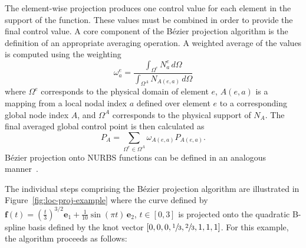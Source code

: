 \documentclass{article}
\renewcommand{\vec}[1]{\boldsymbol{\mathbf{#1}}}
\newcommand{\Bezier}{{B\'{e}zier} }
\begin{document}
The element-wise projection produces one control value for each element in the support of the function.  These values must be combined in order to provide the final control value.  A core component of the B\'ezier projection algorithm is the definition of an appropriate averaging operation.  A weighted average of the values is computed using the weighting
\begin{equation}\label{eqn:Bezier_weight}
\omega_a^e=\dfrac{\int_{\Omega^e} N_{a}^e \, d\Omega}{\int_{\Omega^A} N_{A(e,a)} \, d\Omega}
\end{equation}
where $\Omega^e$ corresponds to the physical domain of element $e$, $A(e,a)$ is a mapping from a local nodal index $a$ defined over element $e$ to a corresponding global node index $A$, and $\Omega^A$ corresponds to the physical support of $N_A$. The final averaged global control point is then calculated as
\begin{equation}
P_A=\sum_{\Omega^e\in \Omega^A } \omega_{A(e,a)} P_{A(e,a)}.
\end{equation}
B\'ezier projection onto NURBS functions can be defined in an analogous manner~\cite{thomas_bezier_2015}.

The individual steps comprising the \Bezier projection algorithm are
illustrated in Figure~\ref{fig:loc-proj-example} where
the curve defined by $\vec{f}(t)=\left( \frac{t}{3}
\right)^{3/2}\vec{e}_1+\frac{1}{10}\sin (\pi t )\,\vec{e}_2$,
$t\in[0,3]$ is projected onto the quadratic B-spline basis defined by
the knot vector $[0,0,0,\sfrac{1}{3},\sfrac{2}{3},1,1,1]$. For this example,
the algorithm proceeds as follows:
\end{document}
